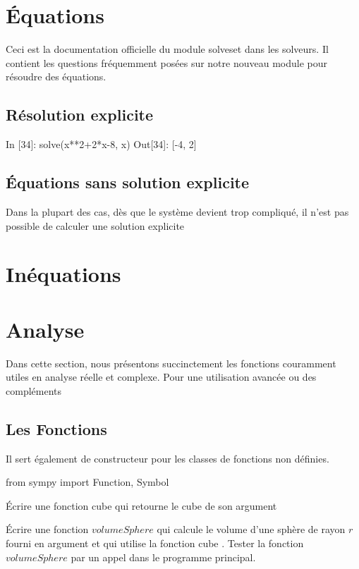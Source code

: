 \section{Équations}
Ceci est la documentation officielle du module solveset dans les solveurs. Il contient les questions fréquemment posées sur notre nouveau module pour résoudre des équations.
 \subsection{Résolution explicite}
 \begin{python}
In [34]: solve(x**2+2*x-8, x)                                                                     
Out[34]: [-4, 2]
\end{python}
 \subsection{Équations sans solution explicite}
Dans la plupart des cas, dès que le système devient trop compliqué, il n’est pas possible de calculer une solution explicite
\section{In\'equations}
\section{Analyse}
Dans cette section, nous présentons succinctement les fonctions couramment utiles en analyse réelle et complexe. 
Pour une utilisation avancée ou des compléments
 \subsection{Les Fonctions}
Il sert également de constructeur pour les classes de fonctions non définies.

\begin{python}
from sympy import Function, Symbol
\end{python}

\begin{exercise}
Écrire une fonction cube qui retourne le cube de son argument
\end{exercise}

\begin{exercise}
Écrire une fonction $volumeSphere$ qui calcule le volume d’une sphère de rayon $r$ fourni
en argument et qui utilise la fonction cube .
Tester la fonction $volumeSphere$ par un appel dans le programme principal.
\end{exercise}


